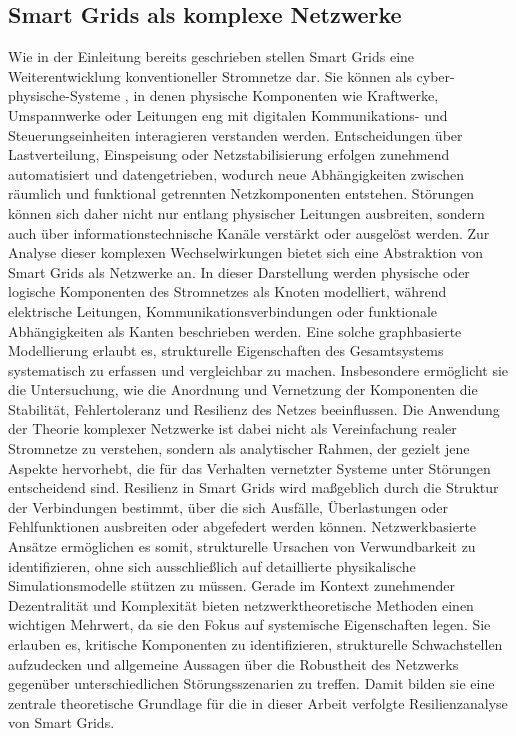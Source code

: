 \documentclass[14pt,a4paper]{scrartcl}
\begin{document}
\subsection{Smart Grids als komplexe Netzwerke}
Wie in der Einleitung bereits geschrieben stellen Smart Grids eine Weiterentwicklung konventioneller Stromnetze dar. Sie können als cyber-physische-Systeme , in denen physische Komponenten wie Kraftwerke, Umspannwerke oder Leitungen eng mit digitalen Kommunikations- und Steuerungseinheiten interagieren verstanden werden. Entscheidungen über Lastverteilung, Einspeisung oder Netzstabilisierung erfolgen zunehmend automatisiert und datengetrieben, wodurch neue Abhängigkeiten zwischen räumlich und funktional getrennten Netzkomponenten entstehen. Störungen können sich daher nicht nur entlang physischer Leitungen ausbreiten, sondern auch über informationstechnische Kanäle verstärkt oder ausgelöst werden.
Zur Analyse dieser komplexen Wechselwirkungen bietet sich eine Abstraktion von Smart Grids als Netzwerke an. In dieser Darstellung werden physische oder logische Komponenten des Stromnetzes als Knoten modelliert, während elektrische Leitungen, Kommunikationsverbindungen oder funktionale Abhängigkeiten als Kanten beschrieben werden. Eine solche graphbasierte Modellierung erlaubt es, strukturelle Eigenschaften des Gesamtsystems systematisch zu erfassen und vergleichbar zu machen. Insbesondere ermöglicht sie die Untersuchung, wie die Anordnung und Vernetzung der Komponenten die Stabilität, Fehlertoleranz und Resilienz des Netzes beeinflussen.
Die Anwendung der Theorie komplexer Netzwerke ist dabei nicht als Vereinfachung realer Stromnetze zu verstehen, sondern als analytischer Rahmen, der gezielt jene Aspekte hervorhebt, die für das Verhalten vernetzter Systeme unter Störungen entscheidend sind. Resilienz in Smart Grids wird maßgeblich durch die Struktur der Verbindungen bestimmt, über die sich Ausfälle, Überlastungen oder Fehlfunktionen ausbreiten oder abgefedert werden können. Netzwerkbasierte Ansätze ermöglichen es somit, strukturelle Ursachen von Verwundbarkeit zu identifizieren, ohne sich ausschließlich auf detaillierte physikalische Simulationsmodelle stützen zu müssen.
Gerade im Kontext zunehmender Dezentralität und Komplexität bieten netzwerktheoretische Methoden einen wichtigen Mehrwert, da sie den Fokus auf systemische Eigenschaften legen. Sie erlauben es, kritische Komponenten zu identifizieren, strukturelle Schwachstellen aufzudecken und allgemeine Aussagen über die Robustheit des Netzwerks gegenüber unterschiedlichen Störungsszenarien zu treffen. Damit bilden sie eine zentrale theoretische Grundlage für die in dieser Arbeit verfolgte Resilienzanalyse von Smart Grids.
\end{document}
